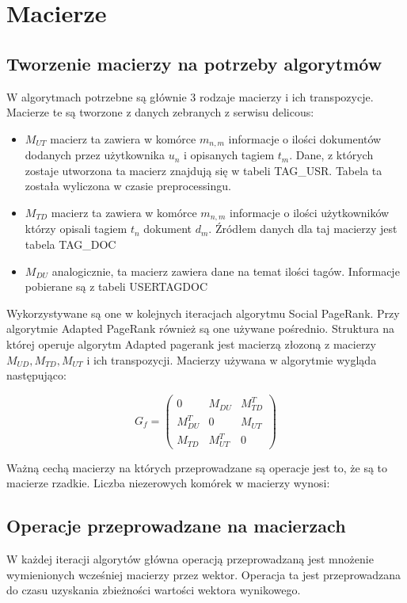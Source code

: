 \documentclass[11pt,a4paper]{report}
\begin{document}
\tableofcontents
\chapter{Macierze}
\section{Tworzenie macierzy na potrzeby algorytmów}
W algorytmach potrzebne są głównie 3 rodzaje macierzy i ich transpozycje. Macierze te są tworzone z danych zebranych z serwisu delicous:
\begin{itemize}
	\item $M_{UT}$ macierz ta zawiera w komórce $m_{n,m}$ informacje o ilości dokumentów dodanych przez użytkownika $u_n$ i opisanych tagiem $t_m$. Dane, z których zostaje utworzona ta macierz znajdują się w tabeli TAG\_USR. Tabela ta została wyliczona w czasie preprocessingu.
	\item $M_{TD}$ macierz ta zawiera w komórce $m_{n,m}$ informacje o ilości użytkowników którzy opisali tagiem $t_n$ dokument $d_m$. Źródłem danych dla taj macierzy jest tabela TAG\_DOC
	\item $M_{DU}$ analogicznie, ta macierz zawiera dane na temat ilości tagów. Informacje pobierane są z tabeli USERTAGDOC
\end{itemize}

Wykorzystywane są one w kolejnych iteracjach algorytmu Social PageRank. Przy algorytmie Adapted PageRank również są one używane pośrednio. Struktura na której operuje algorytm Adapted pagerank jest macierzą złozoną z macierzy $M_{UD} , M_{TD}, M_{UT}$ i ich transpozycji. Macierzy używana w algorytmie wygląda następująco:

\[
 G_f =
 \begin{pmatrix}
  0                     & M_{DU}       & M_{TD}^T \\
  M_{DU}^T  & 0                     & M_{UT}     \\
  M_{TD}       & M_{UT}^T   & 0 
 \end{pmatrix}
\]

Ważną cechą macierzy na których przeprowadzane są operacje jest to, że są to macierze rzadkie. Liczba niezerowych komórek w macierzy wynosi: 

\section{Operacje przeprowadzane na macierzach}
W każdej iteracji algorytów główna operacją przeprowadzaną jest mnożenie wymienionych wcześniej macierzy przez wektor. Operacja ta jest przeprowadzana do czasu uzyskania zbieżności wartości wektora wynikowego.
\end{document}
